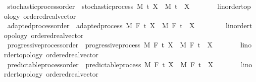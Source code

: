 \begin{isabellebody}
\ stochastic{\isacharunderscore}{\kern0pt}process{\isacharunderscore}{\kern0pt}order\ {\isacharequal}{\kern0pt}\ stochastic{\isacharunderscore}{\kern0pt}process\ M\ t\ X\ \ M\ t\ \ X\ {\isacharcolon}{\kern0pt}{\isacharcolon}{\kern0pt}\ {\isachardoublequoteopen}{\isacharunderscore}{\kern0pt}\ {\isasymRightarrow}\ {\isacharunderscore}{\kern0pt}\ {\isasymRightarrow}\ {\isacharunderscore}{\kern0pt}\ {\isacharcolon}{\kern0pt}{\isacharcolon}{\kern0pt}\ {\isacharbraceleft}{\kern0pt}linorder{\isacharunderscore}{\kern0pt}topology{\isacharcomma}{\kern0pt}\ ordered{\isacharunderscore}{\kern0pt}real{\isacharunderscore}{\kern0pt}vector{\isacharbraceright}{\kern0pt}{\isachardoublequoteclose}\isanewline
{}\isamarkupfalse%
\ adapted{\isacharunderscore}{\kern0pt}process{\isacharunderscore}{\kern0pt}order\ {\isacharequal}{\kern0pt}\ adapted{\isacharunderscore}{\kern0pt}process\ M\ F\ t\ X\ \ M\ F\ t\ \ X\ {\isacharcolon}{\kern0pt}{\isacharcolon}{\kern0pt}\ {\isachardoublequoteopen}{\isacharunderscore}{\kern0pt}\ \ {\isasymRightarrow}\ {\isacharunderscore}{\kern0pt}\ {\isasymRightarrow}\ {\isacharunderscore}{\kern0pt}\ {\isacharcolon}{\kern0pt}{\isacharcolon}{\kern0pt}\ {\isacharbraceleft}{\kern0pt}linorder{\isacharunderscore}{\kern0pt}topology{\isacharcomma}{\kern0pt}\ ordered{\isacharunderscore}{\kern0pt}real{\isacharunderscore}{\kern0pt}vector{\isacharbraceright}{\kern0pt}{\isachardoublequoteclose}\isanewline
{}\isamarkupfalse%
\ progressive{\isacharunderscore}{\kern0pt}process{\isacharunderscore}{\kern0pt}order\ {\isacharequal}{\kern0pt}\ progressive{\isacharunderscore}{\kern0pt}process\ M\ F\ t\ X\ \ M\ F\ t\ \ X\ {\isacharcolon}{\kern0pt}{\isacharcolon}{\kern0pt}\ {\isachardoublequoteopen}{\isacharunderscore}{\kern0pt}\ {\isasymRightarrow}\ {\isacharunderscore}{\kern0pt}\ {\isasymRightarrow}\ {\isacharunderscore}{\kern0pt}\ {\isacharcolon}{\kern0pt}{\isacharcolon}{\kern0pt}\ {\isacharbraceleft}{\kern0pt}linorder{\isacharunderscore}{\kern0pt}topology{\isacharcomma}{\kern0pt}\ ordered{\isacharunderscore}{\kern0pt}real{\isacharunderscore}{\kern0pt}vector{\isacharbraceright}{\kern0pt}{\isachardoublequoteclose}\isanewline
{}\isamarkupfalse%
\ predictable{\isacharunderscore}{\kern0pt}process{\isacharunderscore}{\kern0pt}order\ {\isacharequal}{\kern0pt}\ predictable{\isacharunderscore}{\kern0pt}process\ M\ F\ t\ X\ \ M\ F\ t\ \ X\ {\isacharcolon}{\kern0pt}{\isacharcolon}{\kern0pt}\ {\isachardoublequoteopen}{\isacharunderscore}{\kern0pt}\ {\isasymRightarrow}\ {\isacharunderscore}{\kern0pt}\ {\isasymRightarrow}\ {\isacharunderscore}{\kern0pt}\ {\isacharcolon}{\kern0pt}{\isacharcolon}{\kern0pt}\ {\isacharbraceleft}{\kern0pt}linorder{\isacharunderscore}{\kern0pt}topology{\isacharcomma}{\kern0pt}\ ordered{\isacharunderscore}{\kern0pt}real{\isacharunderscore}{\kern0pt}vector{\isacharbraceright}{\kern0pt}{\isachardoublequoteclose}\isanewline

\end{isabellebody}
